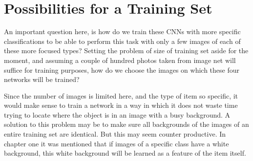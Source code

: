 \documentclass[12pt]{report} %
\begin{document}
\section{Possibilities for a Training Set}
	
	An important question here, is how do we train these CNNs with more specific classifications to be able to perform this task with only a few images of each of these more focused types? Setting the problem of size of training set aside for the moment, and assuming a couple of hundred photos taken from image net will suffice for training purposes, how do we choose the images on which these four networks will be trained?
	
	Since the number of images is limited here, and the type of item so specific, it would make sense to train a network in a way in which it does not waste time trying to locate where the object is in an image with a busy background. A solution to this problem may be to make sure all backgrounds of the images of an entire training set are identical. But this may seem counter productive. In chapter one it was mentioned that if images of a specific class have a white background, this white background will be learned as a feature of the item itself.
	
\end{document}
